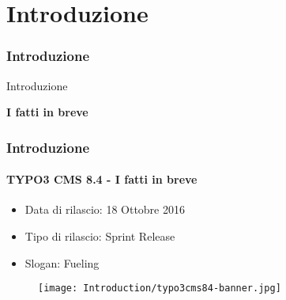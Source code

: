%

\section{Introduzione}
\begin{frame}[fragile]
	\frametitle{Introduzione}

	\begin{center}\huge{Introduzione}\end{center}
	\begin{center}\huge{\color{typo3darkgrey}\textbf{I fatti in breve}}\end{center}

\end{frame}

\begin{frame}[fragile]
	\frametitle{Introduzione}
	\framesubtitle{TYPO3 CMS 8.4 - I fatti in breve}

	\begin{itemize}
		\item Data di rilascio: 18 Ottobre 2016
		\item Tipo di rilascio: Sprint Release
		\item Slogan: Fueling
	\end{itemize}

	\begin{figure}
		\texttt{[image: Introduction/typo3cms84-banner.jpg]}
	\end{figure}

\end{frame}

